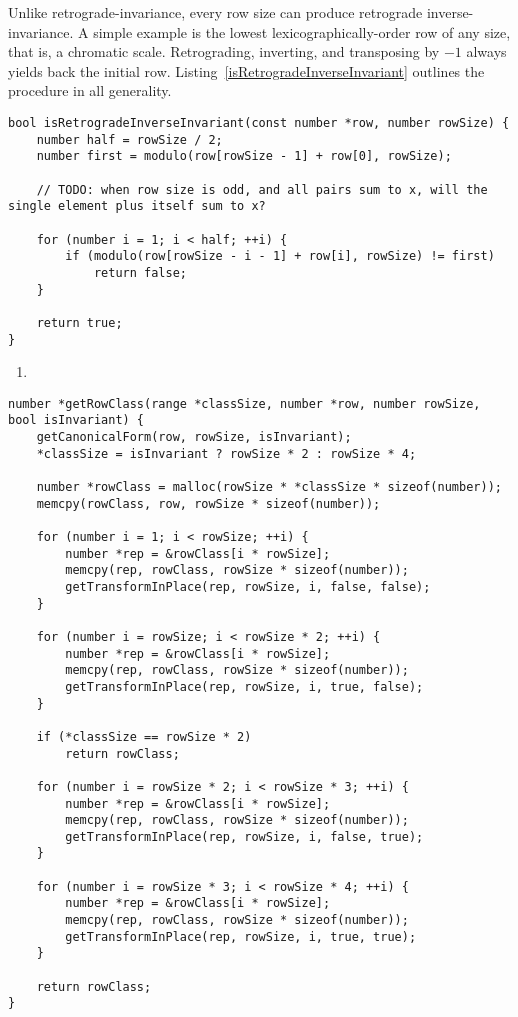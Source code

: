 Unlike retrograde-invariance, every row size can produce retrograde inverse-invariance. A simple example is the lowest lexicographically-order row of any size, that is, a chromatic scale. Retrograding, inverting, and transposing by $-1$ always yields back the initial row. Listing~\ref{isRetrogradeInverseInvariant} outlines the procedure in all generality.

\begin{lstlisting}[caption={Determining whether a row is retrograde inverse-invariant.},label={isRetrogradeInverseInvariant}]
bool isRetrogradeInverseInvariant(const number *row, number rowSize) {
    number half = rowSize / 2;
    number first = modulo(row[rowSize - 1] + row[0], rowSize);

    // TODO: when row size is odd, and all pairs sum to x, will the single element plus itself sum to x?

    for (number i = 1; i < half; ++i) {
        if (modulo(row[rowSize - i - 1] + row[i], rowSize) != first)
            return false;
    }

    return true;
}
\end{lstlisting}

\begin{enumerate}
\addtocounter{enumi}{1}
\item 
\end{enumerate}

\begin{lstlisting}[caption={},label={getRowClass}]
number *getRowClass(range *classSize, number *row, number rowSize, bool isInvariant) {
    getCanonicalForm(row, rowSize, isInvariant);
    *classSize = isInvariant ? rowSize * 2 : rowSize * 4;

    number *rowClass = malloc(rowSize * *classSize * sizeof(number));
    memcpy(rowClass, row, rowSize * sizeof(number));

    for (number i = 1; i < rowSize; ++i) {
        number *rep = &rowClass[i * rowSize];
        memcpy(rep, rowClass, rowSize * sizeof(number));
        getTransformInPlace(rep, rowSize, i, false, false);
    }

    for (number i = rowSize; i < rowSize * 2; ++i) {
        number *rep = &rowClass[i * rowSize];
        memcpy(rep, rowClass, rowSize * sizeof(number));
        getTransformInPlace(rep, rowSize, i, true, false);
    }

    if (*classSize == rowSize * 2)
        return rowClass;

    for (number i = rowSize * 2; i < rowSize * 3; ++i) {
        number *rep = &rowClass[i * rowSize];
        memcpy(rep, rowClass, rowSize * sizeof(number));
        getTransformInPlace(rep, rowSize, i, false, true);
    }

    for (number i = rowSize * 3; i < rowSize * 4; ++i) {
        number *rep = &rowClass[i * rowSize];
        memcpy(rep, rowClass, rowSize * sizeof(number));
        getTransformInPlace(rep, rowSize, i, true, true);
    }

    return rowClass;
}
\end{lstlisting}

